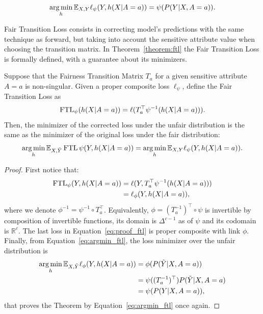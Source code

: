 \begin{equation} \label{eq:argmin_ftl}
    \operatorname*{arg\,min}\limits_{h}\mathbb{E}_{X,Y}\ell_{\psi}(Y, h(X|A=a)) = \psi(P(Y|X,A=a)).
\end{equation}

Fair Transition Loss consists in correcting model's predictions with the same technique as forward, but taking into account the sensitive attribute value when choosing the transition matrix. In Theorem~\ref{theorem:ftl} the Fair Transition Loss is formally defined, with a guarantee about its minimizers.

\begin{theorem}\label{theorem:ftl}
    Suppose that the Fairness Transition Matrix $T_a$ for a given sensitive attribute $A=a$ is non-singular. Given a proper composite loss $\ell_{\psi}$, define the Fair Transition Loss as
    \[\operatorname{FTL}_{\psi}(h(X|A=a)) = \ell(T^{\top}_a \psi^{-1}(h(X|A=a))).\]
    Then, the minimizer of the corrected loss under the unfair distribution is the same as the minimizer of the original loss under the fair distribution:
    \[  \operatorname*{arg\,min}\limits_{h}\mathbb{E}_{X,\tilde{Y}}\operatorname{FTL}{\psi}(Y, h(X|A=a)) = \operatorname*{arg\,min}\limits_{h}\mathbb{E}_{X,Y}\ell_{\psi}(Y, h(X|A=a)).\]
\end{theorem}
\begin{proof}
    First notice that:
    \begin{align} \label{eq:proof_ftl}
        \operatorname{FTL}_{\psi}(Y, h(X|A=a)) &= \ell(Y, T^{\top}_a \psi^{-1}(h(X|A=a))) \nonumber \\
        &= \ell_{\phi}(Y, h(X|A=a)),
    \end{align}
    where we denote $\phi^{-1} = \psi^{-1} \circ T_a^{\top}$. Equivalently, $\phi = (T_a^{-1})^{\top} \circ \psi$ is invertible by composition of invertible functions, its domain is $\Delta^{c-1}$ as of $\psi$ and its codomain is $\mathbb{R}^{c}$. The last loss in Equation~\ref{eq:proof_ftl} is proper composite with link $\phi$. Finally, from Equation~\ref{eq:argmin_ftl}, the loss minimizer over the unfair distribution is
    \begin{align}
        \operatorname*{arg\,min}\limits_{h}\mathbb{E}_{X,\tilde{Y}}\ell_{\phi}(Y, h(X|A=a)) &= \phi(P(\tilde{Y}|X,A=a)) \\
        &= \psi((T_a^{-1})^{\top}) P(\tilde{Y}|X,A=a) \\
        &= \psi(P(Y|X,A=a)),
    \end{align}
    that proves the Theorem by Equation~\ref{eq:argmin_ftl} once again.
\end{proof}

